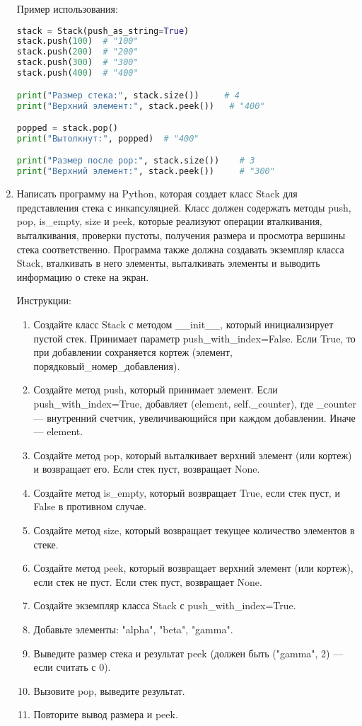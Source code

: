 \begin{enumerate}
Пример использования:
\begin{lstlisting}[language=Python]
stack = Stack(push_as_string=True)
stack.push(100)  # "100"
stack.push(200)  # "200"
stack.push(300)  # "300"
stack.push(400)  # "400"

print("Размер стека:", stack.size())     # 4
print("Верхний элемент:", stack.peek())   # "400"

popped = stack.pop()
print("Вытолкнут:", popped)  # "400"

print("Размер после pop:", stack.size())    # 3
print("Верхний элемент:", stack.peek())     # "300"
\end{lstlisting}

\item Написать программу на Python, которая создает класс Stack для представления стека с инкапсуляцией. Класс должен содержать методы push, pop, is\_empty, size и peek, которые реализуют операции вталкивания, выталкивания, проверки пустоты, получения размера и просмотра вершины стека соответственно. Программа также должна создавать экземпляр класса Stack, вталкивать в него элементы, выталкивать элементы и выводить информацию о стеке на экран.

Инструкции:
\begin{enumerate}
    \item Создайте класс Stack с методом \_\_init\_\_, который инициализирует пустой стек. Принимает параметр push\_with\_index=False. Если True, то при добавлении сохраняется кортеж (элемент, порядковый\_номер\_добавления).
    \item Создайте метод push, который принимает элемент. Если push\_with\_index=True, добавляет (element, self.\_counter), где \_counter — внутренний счетчик, увеличивающийся при каждом добавлении. Иначе — element.
    \item Создайте метод pop, который выталкивает верхний элемент (или кортеж) и возвращает его. Если стек пуст, возвращает None.
    \item Создайте метод is\_empty, который возвращает True, если стек пуст, и False в противном случае.
    \item Создайте метод size, который возвращает текущее количество элементов в стеке.
    \item Создайте метод peek, который возвращает верхний элемент (или кортеж), если стек не пуст. Если стек пуст, возвращает None.
    \item Создайте экземпляр класса Stack с push\_with\_index=True.
    \item Добавьте элементы: "alpha", "beta", "gamma".
    \item Выведите размер стека и результат peek (должен быть ("gamma", 2) — если считать с 0).
    \item Вызовите pop, выведите результат.
    \item Повторите вывод размера и peek.
\end{enumerate}


\end{enumerate}
